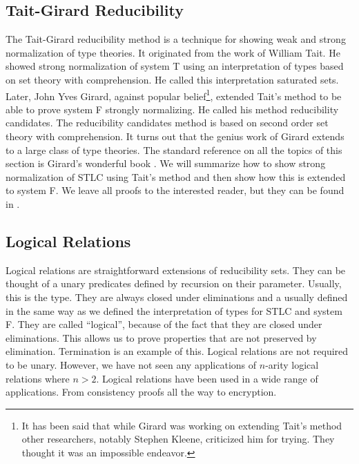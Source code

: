 \documentclass{article}
\begin{document}
\subsection{Tait-Girard Reducibility}
\label{subsec:tait-griard_reduciblity}
The Tait-Girard reducibility method is a technique for showing weak and
strong normalization of type theories.  It originated from the work of
William Tait.  He showed strong normalization of system T using an
interpretation of types based on set theory with comprehension.  He
called this interpretation saturated sets.  Later, John Yves Girard,
against popular belief\footnote{It has been said that while Girard was
  working on extending Tait's method other researchers, notably
  Stephen Kleene, criticized him for trying.  They thought it was an
  impossible endeavor.}, extended Tait's method to be able to prove
system F strongly normalizing.  He called his method reducibility
candidates. The reducibility candidates method is based on second order
set theory with comprehension.  It turns out that the genius work of
Girard extends to a large class of type theories. The standard
reference on all the topics of this section is Girard's wonderful book
\cite{Girard:1989}.  We will summarize how to show strong
normalization of STLC using Tait's method and then show how this is
extended to system F.  We leave all proofs to the interested reader,
but they can be found in \cite{Girard:1989}.





\subsection{Logical Relations}
\label{subsec:logical_relations}
Logical relations are straightforward extensions of reducibility sets.
They can be thought of a unary predicates defined by recursion on
their parameter.  Usually, this is the type.  They are always closed
under eliminations and a usually defined in the same way as we defined
the interpretation of types for STLC and system F.  They are called
``logical'', because of the fact that they are closed under
eliminations.  This allows us to prove properties that are not
preserved by elimination.  Termination is an example of this.  Logical
relations are not required to be unary.  However, we have not seen any
applications of $n$-arity logical relations where $n > 2$.  Logical
relations have been used in a wide range of applications.  From
consistency proofs all the way to encryption.
\end{document}
